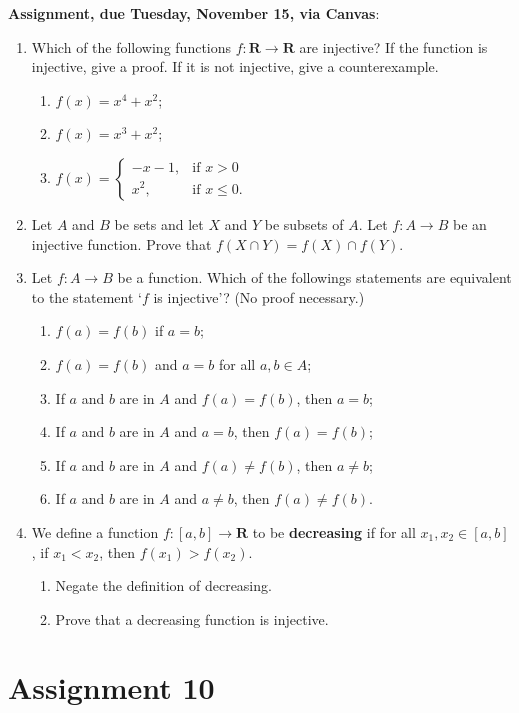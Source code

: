 \documentclass[12pt]{article}
\begin{document}
\noindent \textbf{Assignment, due Tuesday, November 15, via Canvas}:
\begin{enumerate}
\item Which of the following functions $f \colon \mathbf{R}\to \mathbf{R}$ are injective? If the function is injective, give a proof. If it is not injective, give a counterexample.
 \begin{enumerate}
 \item $f(x) = x^4 + x^2$;
 \item $f(x) = x^3 + x^2$;
 \item $f(x) =
 \begin{cases}
 -x-1, & \text{if $x > 0$} \\
 x^2, & \text{if $x \leq 0$}.
 \end{cases}
 $ 
 \end{enumerate}
\item Let $A$ and $B$ be sets and let $X$ and $Y$ be subsets of $A$. Let $f \colon A \to B$ be an injective function. Prove that $f(X \cap Y) = f(X) \cap f(Y)$.
\item Let $f \colon A \to B$ be a function. Which of the followings statements are equivalent to the statement `$f$ is injective'? (No proof necessary.)
 \begin{enumerate}
 \item $f(a) = f(b)$ if $a = b$;
 \item $f(a) = f(b)$ and $a = b$ for all $a,b \in A$;
 \item If $a$ and $b$ are in $A$ and $f(a) = f(b)$, then $a = b$;
 \item If $a$ and $b$ are in $A$ and $a = b$, then $f(a) = f(b)$;
 \item If $a$ and $b$ are in $A$ and $f(a) \neq f(b)$, then $a \neq b$;
 \item If $a$ and $b$ are in $A$ and $a \neq b$, then $f(a) \neq f(b)$. 
 \end{enumerate}
\item We define a function $f\colon [a,b] \to \mathbf{R}$ to be \textbf{decreasing} if for all $x_1,x_2 \in [a,b]$, if $x_1 < x_2$, then $f(x_1) > f(x_2)$.
 \begin{enumerate}
 \item Negate the definition of decreasing.
 \item Prove that a decreasing function is injective.
 \end{enumerate}
\end{enumerate}


\newpage
\section[10 (due November 22): Composition of functions.]{Assignment 10}
\end{document}
